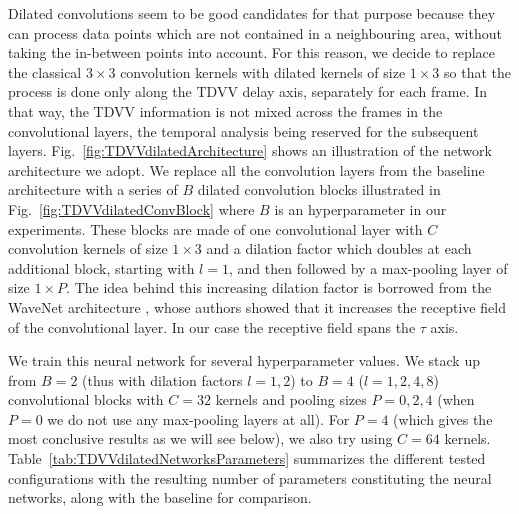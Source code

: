 Dilated convolutions seem to be good candidates for that purpose because they can process data points which are not contained in a neighbouring area, without taking the in-between points into account. For this reason, we decide to replace the classical $3 \times 3$ convolution kernels with dilated kernels of size $1 \times 3$ so that the process is done only along the TDVV delay axis, separately for each frame. In that way, the TDVV information is not mixed across the frames in the convolutional layers, the temporal analysis being reserved for the subsequent layers. Fig.~\ref{fig:TDVVdilatedArchitecture} shows an illustration of the network architecture we adopt. We replace all the convolution layers from the baseline architecture with a series of $B$ dilated convolution blocks illustrated in Fig.~\ref{fig:TDVVdilatedConvBlock} where $B$ is an hyperparameter in our experiments. These blocks are made of one convolutional layer with $C$ convolution kernels of size $1 \times 3$ and a dilation factor which doubles at each additional block, starting with $l=1$, and then followed by a max-pooling layer of size $1 \times P$. The idea behind this increasing dilation factor is borrowed from the WaveNet architecture \cite{oord_wavenet:_2016}, whose authors showed that it increases the receptive field of the convolutional layer. In our case the receptive field spans the $\tau$ axis.


We train this neural network for several hyperparameter values. We stack up from $B=2$ (thus with dilation factors $l=1,2$) to $B=4$ ($l=1,2,4,8$) convolutional blocks with $C=32$ kernels and pooling sizes $P=0,2,4$ (when $P=0$ we do not use any max-pooling layers at all). For $P=4$ (which gives the most conclusive results as we will see below), we also try using $C=64$ kernels. Table~\ref{tab:TDVVdilatedNetworksParameters} summarizes the different tested configurations with the resulting number of parameters constituting the neural networks, along with the baseline for comparison.


